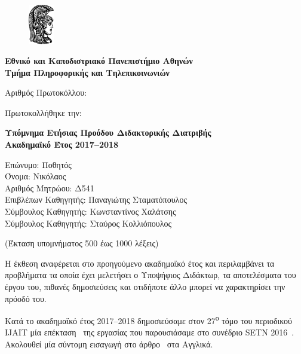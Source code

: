 \documentclass[a4paper]{article}
\begin{document}

\begin{figure}
  \includegraphics[width=3em]{athena}
\end{figure}
\textbf{Εθνικό και Καποδιστριακό Πανεπιστήμιο Αθηνών \\
        Τμήμα Πληροφορικής και Τηλεπικοινωνιών}

\vspace{5em}

\noindent
Αριθμός Πρωτοκόλλου:

\noindent
Πρωτοκολλήθηκε την:

\vspace{1.3em}

\begin{center}
  \textbf{Υπόμνημα Ετήσιας Προόδου Διδακτορικής Διατριβής \\
          Ακαδημαϊκό Έτος 2017–2018}
\end{center}

\vspace{1em}

\noindent
Επώνυμο: Ποθητός \\
Όνομα: Νικόλαος \\
Αριθμός Μητρώου: Δ541 \\
Επιβλέπων Καθηγητής: Παναγιώτης Σταματόπουλος \\
Σύμβουλος Καθηγητής: Κωνσταντίνος Χαλάτσης \\
Σύμβουλος Καθηγητής: Σταύρος Κολλιόπουλος

\begin{center}
  (Έκταση υπομνήματος 500 έως 1000 λέξεις)
\end{center}

Η έκθεση αναφέρεται στο προηγούμενο ακαδημαϊκό έτος και
περιλαμβάνει τα προβλήματα τα οποία έχει μελετήσει ο
Υποψήφιος Διδάκτωρ, τα αποτελέσματα του έργου του, πιθανές
δημοσιεύσεις και οτιδήποτε άλλο μπορεί να χαρακτηρίσει την
πρόοδό του.

\vspace{1em}

Κατά το ακαδημαϊκό έτος 2017–2018 δημοσιεύσαμε στον
27\textsuperscript{ο} τόμο του περιοδικού IJAIT μία
επέκταση~\cite{Pothitos2018} της εργασίας που παρουσιάσαμε
στο συνέδριο SETN 2016~\cite{Pothitos2016-PoPS}. Ακολουθεί
μία σύντομη εισαγωγή στο άρθρο~\cite{Pothitos2018} στα
Αγγλικά.
\end{document}
